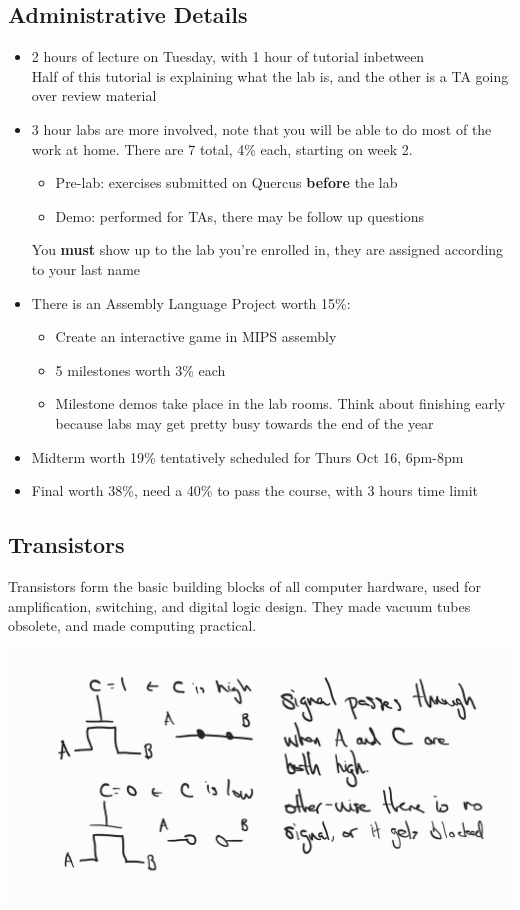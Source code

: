 \subsection{Administrative Details}
\begin{itemize}
\item 2 hours of lecture on Tuesday, with 1 hour of tutorial inbetween \\
Half of this tutorial is explaining what the lab is, and the other is a TA going over review material
\item 3 hour labs are more involved, note that you will be able to do most of the work at home. There are 7 total, 4\% each, starting on week 2. 
    \begin{itemize}
    \item Pre-lab: exercises submitted on Quercus \textbf{before} the lab
    \item Demo: performed for TAs, there may be follow up questions
    \end{itemize}
    You \textbf{must} show up to the lab you're enrolled in, they are assigned according to your last name
\item There is an Assembly Language Project worth 15\%:
    \begin{itemize}
    \item Create an interactive game in MIPS assembly
    \item 5 milestones worth 3\% each
    \item Milestone demos take place in the lab rooms. Think about finishing early because labs may get pretty busy towards the end of the year
    \end{itemize}
\item Midterm worth 19\% tentatively scheduled for Thurs Oct 16, 6pm-8pm
\item Final worth 38\%, need a 40\% to pass the course, with 3 hours time limit
\end{itemize}

\subsection{Transistors}

Transistors form the basic building blocks of all computer hardware, used for amplification, switching, and digital logic design. They made vacuum tubes obsolete, and made computing practical.

\includegraphics{csc258/figures/transistor.jpg}

